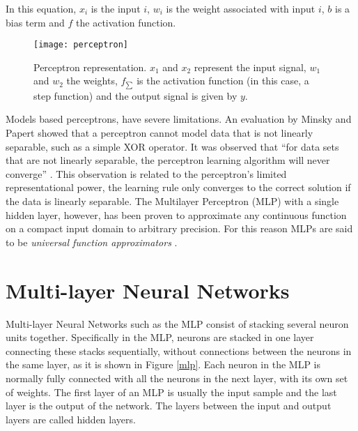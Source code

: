In this equation, $x_{i}$ is the input $i$, $w_{i}$ is the weight associated with input $i$, $b$ is a
bias term and $f$ the activation function. 
\begin{figure}[!htb]
\centering
\texttt{[image: perceptron]}
\caption{Perceptron representation. $x_{1}$ and $x_{2}$ represent the input signal, $w_{1}$ and $w_{2}$ the weights, $f_{\sum}$ is the activation function (in this case, a step function) and the output signal is given by $y$.}
\label{perceptron}
\end{figure}



Models based perceptrons, have severe limitations. An evaluation by Minsky and Papert \cite{papert1969perceptrons} showed that a perceptron cannot model data that is not linearly separable, such as a simple XOR operator. It was observed that ``for data sets that are not linearly separable, the perceptron learning algorithm will never converge'' \cite{bishop2006pattern}. This observation is related to the perceptron's limited representational power, the learning rule only converges to the correct solution if the data is linearly separable. The Multilayer Perceptron (MLP) with a single hidden layer, however, has been proven \cite{hornik1989multilayer} to approximate any continuous function on a compact input domain to arbitrary precision. For this reason MLPs are said to be \textit{universal function approximators} \cite{hornik1989multilayer}.

\section{Multi-layer Neural Networks}
Multi-layer Neural Networks such as the MLP consist of stacking several neuron units together. Specifically in the MLP, neurons are stacked in one layer connecting these stacks sequentially, without connections between the neurons in the same layer, as it is shown in Figure \ref{mlp}. Each neuron in the MLP is normally fully connected with all the neurons in the next layer, with its own set of weights. The first layer of an MLP is usually the input sample and the last layer is the output of the network. The layers between the input and output layers are called hidden layers.

